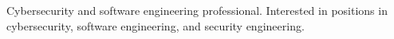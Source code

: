 

\begin{cvparagraph}

Cybersecurity and software engineering professional. Interested in positions in cybersecurity, software engineering, and security engineering.

\end{cvparagraph}

